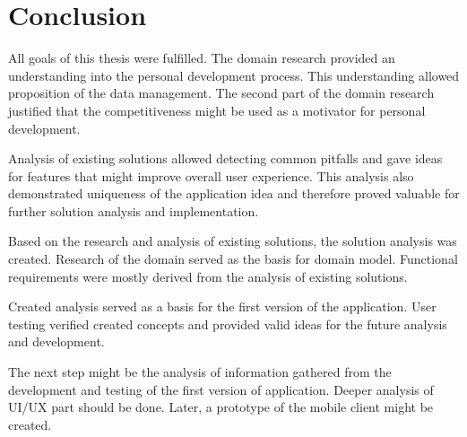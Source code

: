 
\chapter{Conclusion}\label{ch:conclusion}

All goals of this thesis were fulfilled.
The domain research provided an understanding into the personal development process.
This understanding allowed proposition of the data management.
The second part of the domain research justified that the competitiveness might be used as a motivator for personal development.

Analysis of existing solutions allowed detecting common pitfalls and gave ideas for features that might improve overall user experience.
This analysis also demonstrated uniqueness of the application idea and therefore proved valuable for further solution analysis and implementation.

Based on the research and analysis of existing solutions, the solution analysis was created.
Research of the domain served as the basis for domain model.
Functional requirements were mostly derived from the analysis of existing solutions.

Created analysis served as a basis for the first version of the application.
User testing verified created concepts and provided valid ideas for the future analysis and development.

The next step might be the analysis of information gathered from the development and testing of the first version of application.
Deeper analysis of UI/UX part should be done.
Later, a prototype of the mobile client might be created.